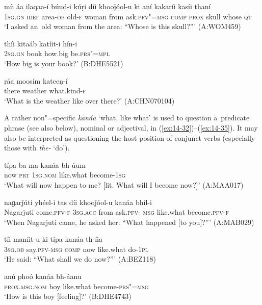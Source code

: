 \begin{exe}
\ex
\label{ex:14-29}
\gll míi áa ilaqaa-í búuḍ-i kúṛi díi khooǰóol-u  ki aní kakaríi kasíi thaní \\
\textsc{1sg.gn} \textsc{idef} area-\textsc{ob} old-\textsc{f} woman from ask.\textsc{pfv"=msg} \textsc{comp} \textsc{prox} skull whose \textsc{qt} \\
\glt `I asked an~old woman from the area: ``Whose is this skull?''' (A:WOM459)

\ex
\label{ex:14-30}
\gll thíi kitaáb katíit-i hín-i \\
\textsc{2sg.gn} book how.big be.\textsc{prs"=mpl} \\
\glt `How big is your book?' (B:DHE5521)

\ex
\label{ex:14-31}
\gll ṛáa moosím kateeṇ-í \\
there weather what.kind-\textsc{f} \\
\glt `What is the weather like over there?' (A:CHN070104)
\end{exe}

A rather non"=specific \textit{kanáa} `what, like what' is used to question a~predicate phrase (see also below), nominal or adjectival, in (\ref{ex:14-32})--(\ref{ex:14-35}). It may also be interpreted as questioning the host position of conjunct verbs (especially those with \textit{the-} `do'). 

\begin{exe}
\ex
\label{ex:14-32}
\gll típa ba ma kanáa bh-úum \\
now \textsc{prt} \textsc{1sg.nom} like.what become-\textsc{1sg} \\
\glt `What will now happen to me? [lit. What will I become now?]' (A:MAA017)

\ex
\label{ex:14-33}
\gll naɡarǰúti yhéel-i tas díi khooǰóol-u kanáa bhíl-i \\
Nagarjuti come.\textsc{pfv-f} \textsc{3sg.acc} from ask.\textsc{pfv- msg}  like.what become.\textsc{pfv-f} \\
\glt `When Nagarjuti came, he asked her: ``What happened [to you]?''' (A:MAB029)

\ex
\label{ex:14-34}
\gll tíi maníit-u ki típa kanáa th-íia \\
\textsc{3sg.ob} say.\textsc{pfv-msg} \textsc{comp} now like.what do-\textsc{1pl} \\
\glt `He said: ``What shall we do now?''' (A:BEZ118)

\ex
\label{ex:14-35}
\gll anú phoó kanáa bh-áanu \\
\textsc{prox.msg.nom} boy like.what become-\textsc{prs"=msg} \\
\glt `How is this boy [feeling]?' (B:DHE4743)
\end{exe}

